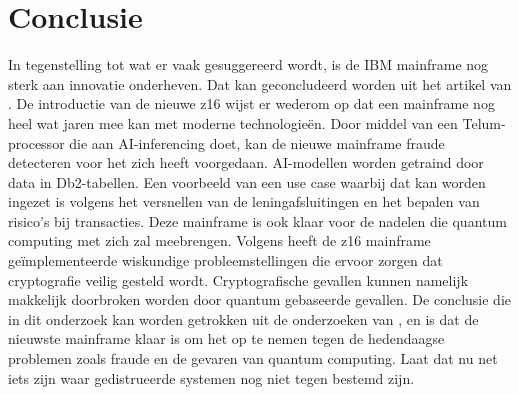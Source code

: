 
\chapter{Conclusie}
\label{ch:conclusie}



In tegenstelling tot wat er vaak gesuggereerd wordt, is de IBM mainframe nog sterk aan innovatie onderheven. Dat kan geconcludeerd worden uit het artikel van \textcite{Almekinders2022}. De introductie van de nieuwe z16 wijst er wederom op dat een mainframe nog heel wat jaren mee kan met moderne technologieën. Door middel van een Telum-processor die aan AI-inferencing doet, kan de nieuwe mainframe fraude detecteren voor het zich heeft voorgedaan. AI-modellen worden getraind door data in Db2-tabellen. Een voorbeeld van een use case waarbij dat kan worden ingezet is volgens \textcite{Sarkar2020} het versnellen van de leningafsluitingen en het bepalen van risico's bij transacties. Deze mainframe is ook klaar voor de nadelen die quantum computing met zich zal meebrengen. Volgens \textcite{Almekinders2022} heeft de z16 mainframe geïmplementeerde wiskundige probleemstellingen die ervoor zorgen dat cryptografie veilig gesteld wordt. Cryptografische gevallen kunnen namelijk makkelijk doorbroken worden door quantum gebaseerde gevallen. De conclusie die in dit onderzoek kan worden getrokken uit de onderzoeken van \citeauthor{Almekinders2022}, \citeauthor{Sarkar2020} en \citeauthor{Cammarota2020} is dat de nieuwste mainframe klaar is om het op te nemen tegen de hedendaagse problemen zoals fraude en de gevaren van quantum computing. Laat dat nu net iets zijn waar gedistrueerde systemen nog niet tegen bestemd zijn. 

